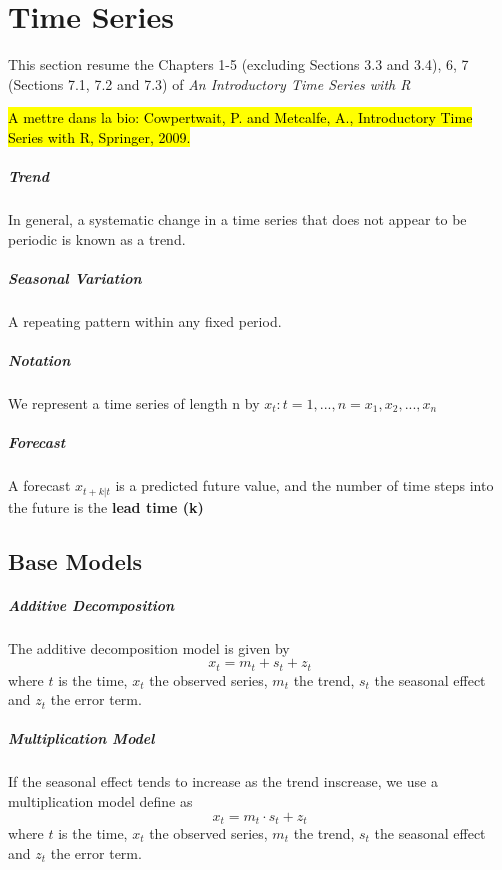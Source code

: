 \chapter{Time Series}

{ \color{red} This section resume the Chapters 1-5 (excluding Sections 3.3 and 3.4), 6, 7 (Sections 7.1, 7.2 and 7.3) of \emph{An Introductory Time Series with R} }

\hl{A mettre dans la bio: Cowpertwait, P. and Metcalfe, A., Introductory Time Series with R, Springer, 2009.}

\paragraph{Trend}
In general, a systematic change in a time series that does not appear to be periodic is known as a trend.

\paragraph{Seasonal Variation}
A repeating pattern within any fixed period.

\paragraph{Notation}
We represent a time series of length n by ${x_t : t = 1,...,n} = {x_1, x_2, ..., x_n}$

\paragraph{Forecast}
A forecast $\hat{x}_{t+k|t}$ is a predicted future value, and the number of time steps into the future is the \textbf{lead time (k)}

\section{Base Models}

\paragraph{Additive Decomposition}
The additive decomposition model is given by
\[ x_t = m_t + s_t + z_t \]
where $t$ is the time, $x_t$ the observed series, $m_t$ the trend, $s_t$ the seasonal effect and $z_t$ the error term.

\paragraph{Multiplication Model}
If the seasonal effect tends to increase as the trend inscrease, we use a multiplication model define as
\[ x_t = m_t \cdot s_t + z_t \]
where $t$ is the time, $x_t$ the observed series, $m_t$ the trend, $s_t$ the seasonal effect and $z_t$ the error term.


